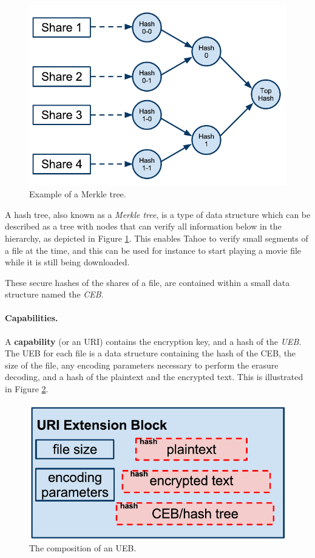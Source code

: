 \documentclass[english,12pt,a4paper]{book}
\begin{document}
\begin{figure}[h]
    \centering
    \includegraphics[width=0.9\columnwidth]{Tahoe-MerkleTree.pdf}
    \caption{Example of a Merkle tree.}
    \label{fig:tahoemerkletree}
\end{figure}

A hash tree, also known as a \emph{Merkle tree}, is a type of data structure
which can be described as a tree with nodes that can verify all information
below in the hierarchy, as depicted in Figure \ref{fig:tahoemerkletree}. This
enables Tahoe to verify small segments of a file at the time, and this can be
used for instance to start playing a movie file while it is still being
downloaded.

These secure hashes of the shares of a file, are contained within a small
data structure named the \emph{\ac{CEB}}.

\paragraph{Capabilities.}

A \textbf{capability} (or an URI) contains the encryption key, and a hash of the
\emph{\ac{UEB}}. The \ac{UEB} for each file is a data structure containing the
hash of the \ac{CEB}, the size of the file, any encoding parameters necessary to
perform the erasure decoding, and a hash of the plaintext and the encrypted
text. This is illustrated in Figure \ref{fig:tahoeueb}.

\begin{figure}[!h]
    \centering
    \includegraphics[width=0.9\columnwidth]{Tahoe-UEB.pdf}
    \caption{The composition of an \ac{UEB}.}
    \label{fig:tahoeueb}
\end{figure}
\end{document}
